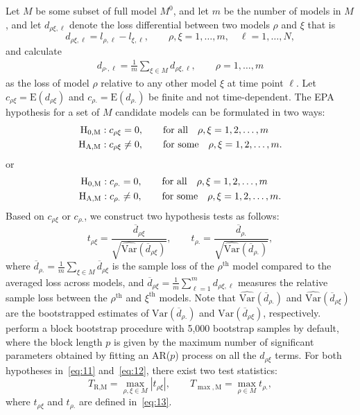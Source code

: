 \documentclass[12pt,a4paper]{article}
\begin{document}
Let $M$ be some subset of full model $M^0$, and let $m$ be the number of models in $M$, and let $d_{\rho \xi, \ell}$ denote the loss differential between two models $\rho$ and $\xi$ that is
\begin{equation*}
d_{\rho \xi, \ell} = l_{\rho, \ell} - l_{\xi, \ell}, \qquad \rho, \xi=1,\dots,m, \quad \ell=1,\dots,N,
\end{equation*}
and calculate 
\begin{align*}
d_{\rho\cdot, \ell} = \frac{1}{m}\sum_{\xi\in M}d_{\rho \xi,\ell}, \qquad \rho = 1,\dots,m
\end{align*}
as the loss of model $\rho$ relative to any other model $\xi$ at time point $\ell$. Let $c_{\rho \xi} = \text{E}(d_{\rho \xi})$ and $c_{\rho.} = \text{E}(d_{\rho.})$ be finite and not time-dependent. The EPA hypothesis for a set of $M$ candidate models can be formulated in two ways:
\begin{align}
\text{H}_{0,\text{M}}: c_{\rho \xi}&=0, \qquad \text{for all}\quad \rho, \xi = 1,2,\dots,m\notag\\
\text{H}_{\text{A,M}}: c_{\rho \xi}&\neq 0, \qquad \text{for some}\quad \rho, \xi = 1,2,\dots,m.\label{eq:11}
\end{align}
or
\begin{align}
\text{H}_{0,\text{M}}: c_{\rho.}&=0, \qquad \text{for all}\quad \rho, \xi = 1,2,\dots,m\notag\\
\text{H}_{\text{A,M}}: c_{\rho.}&\neq 0, \qquad \text{for some}\quad \rho, \xi = 1,2,\dots,m.\label{eq:12}
\end{align}
Based on $c_{\rho \xi}$ or $c_{\rho.}$, we construct two hypothesis tests as follows:
\begin{equation}
t_{\rho \xi} = \frac{\overline{d}_{\rho \xi}}{\sqrt{\widehat{\text{Var}}(\overline{d}_{\rho \xi})}}, \qquad t_{\rho.} = \frac{\overline{d}_{\rho.}}{\sqrt{\widehat{\text{Var}}(\overline{d}_{\rho.})}}, \label{eq:13}
\end{equation}
where $\overline{d}_{\rho.} = \frac{1}{m}\sum_{\xi\in M}\overline{d}_{\rho \xi}$ is the sample loss of the $\rho^{\text{th}}$ model compared to the averaged loss across models, and $\overline{d}_{\rho \xi} =\frac{1}{m}\sum^m_{\ell=1}d_{\rho\xi,\ell}$ measures the relative sample loss between the $\rho^{\text{th}}$ and $\xi^{\text{th}}$ models. Note that $\widehat{\text{Var}}\left(\overline{d}_{\rho.}\right)$ and $\widehat{\text{Var}}\left(\overline{d}_{\rho\xi}\right)$ are the bootstrapped estimates of $\text{Var}\left(\overline{d}_{\rho.}\right)$ and $\text{Var}\left(\overline{d}_{\rho\xi}\right)$, respectively. \cite{BC14} perform a block bootstrap procedure with 5,000 bootstrap samples by default, where the block length $p$ is given by the maximum number of significant parameters obtained by fitting an AR($p$) process on all the $d_{\rho\xi}$ terms. For both hypotheses in~\eqref{eq:11} and~\eqref{eq:12}, there exist two test statistics:
\begin{equation*}
T_{\text{R}, \text{M}} = \max_{\rho,\xi\in M}\left|t_{\rho\xi}\right|,\qquad T_{\max, \text{M}} = \max_{\rho\in M} t_{\rho.},
\end{equation*} 
where $t_{\rho\xi}$ and $t_{\rho.}$ are defined in~\eqref{eq:13}.
 
\end{document}

